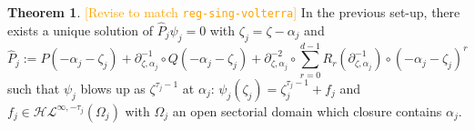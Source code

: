 \documentclass{article}
\theoremstyle{definition}
\newtheorem{theorem}{Theorem}[section]
\begin{document}
\begin{theorem}\label{thm1-dim}
\textcolor{orange}{[Revise to match \texttt{reg-sing-volterra}]} In the previous set-up, there exists a unique solution of $\hat{P}_j\psi_j=0$ with $\zeta_j=\zeta-\alpha_j$ and
\begin{equation}\label{P-hat_j}
\hat{P}_j:=P(-\alpha_j-\zeta_j)+\partial_{\zeta,\alpha_j}^{-1}\circ Q(-\alpha_j-\zeta_j)+\partial_{\zeta,\alpha_j}^{-2}\circ\sum_{r=0}^{d-1}R_r(\partial_{\zeta,\alpha_j}^{-1})\circ (-\alpha_j-\zeta_j)^r
\end{equation}
such that $\psi_j$ blows up as $\zeta^{\tau_j-1}$ at $\alpha_j$:
${\psi}_j(\zeta_j)=\zeta_j^{\tau_j-1}+f_j$ and $f_j\in\mathcal{HL}^{\infty,-\tau_j}(\Omega_j)$ with $\Omega_j$ an open sectorial domain which closure contains $\alpha_j$.
\end{theorem}
\end{document}
